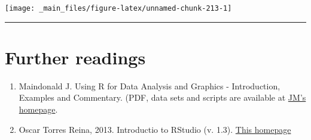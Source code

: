 \documentclass[a4paper,12pt,oneside]{book}
\providecommand{\tightlist}{%
  \setlength{\itemsep}{0pt}\setlength{\parskip}{0pt}}
\begin{document}
\texttt{[image: \_main\_files/figure-latex/unnamed-chunk-213-1]}

\begin{center}\rule{0.5\linewidth}{0.5pt}\end{center}

\hypertarget{further-readings-12}{%
\section{Further readings}\label{further-readings-12}}

\begin{enumerate}
\def\labelenumi{\arabic{enumi}.}
\tightlist
\item
  Maindonald J. Using R for Data Analysis and Graphics - Introduction, Examples and Commentary. (PDF, data sets and scripts are available at \href{https://cran.r-project.org/doc/contrib/usingR.pdff}{JM's homepage}.
\item
  Oscar Torres Reina, 2013. Introductio to RStudio (v. 1.3). \href{https://dss.princeton.edu/training/RStudio101.pdf}{This homepage}
\end{enumerate}
\end{document}
